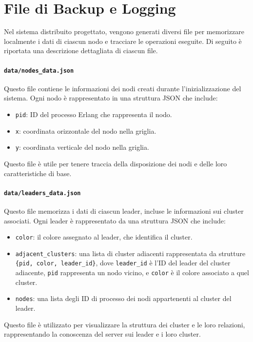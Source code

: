 \documentclass[12pt, a4paper]{report}
\begin{document}
\section{File di Backup e Logging}

Nel sistema distribuito progettato, vengono generati diversi file per memorizzare localmente i dati di ciascun nodo e tracciare le operazioni eseguite. Di seguito è riportata una descrizione dettagliata di ciascun file.

\paragraph{\texttt{data/nodes\_data.json}} Questo file contiene le informazioni dei nodi creati durante l'inizializzazione del sistema. Ogni nodo è rappresentato in una struttura JSON che include:
\begin{itemize}
    \item \texttt{pid}: ID del processo Erlang che rappresenta il nodo.
    \item \texttt{x}: coordinata orizzontale del nodo nella griglia.
    \item \texttt{y}: coordinata verticale del nodo nella griglia.
\end{itemize}
Questo file è utile per tenere traccia della disposizione dei nodi e delle loro caratteristiche di base.

\paragraph{\texttt{data/leaders\_data.json}} Questo file memorizza i dati di ciascun leader, incluse le informazioni sui cluster associati. Ogni leader è rappresentato da una struttura JSON che include:
\begin{itemize}
    \item \texttt{color}: il colore assegnato al leader, che identifica il cluster.
    \item \texttt{adjacent\_clusters}: una lista di cluster adiacenti rappresentata da strutture \texttt{\{pid, color, leader\_id\}}, dove \texttt{leader\_id} è l'ID del leader del cluster adiacente, \texttt{pid} rappresenta un nodo vicino, e \texttt{color} è il colore associato a quel cluster.
    \item \texttt{nodes}: una lista degli ID di processo dei nodi appartenenti al cluster del leader.
\end{itemize}
Questo file è utilizzato per visualizzare la struttura dei cluster e le loro relazioni, rappresentando la conoscenza del server sui leader e i loro cluster.
\end{document}
